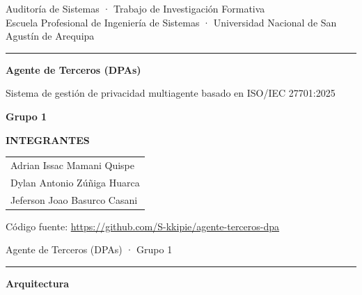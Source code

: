 \documentclass[11pt,a4paper]{article}
\begin{document}
\color{tinta}

{\small\color{suave} Auditoría de Sistemas · Trabajo de Investigación Formativa\\
Escuela Profesional de Ingeniería de Sistemas · Universidad Nacional de San Agustín de Arequipa}

{\color{guinda}\rule{\linewidth}{1.2pt}}

{\raggedright
\vspace*{38mm}
{\fontsize{30}{34}\selectfont\bfseries Agente de Terceros (DPAs)\par}
\vspace{4mm}
{\large\color{suave} Sistema de gestión de privacidad multiagente basado en ISO/IEC 27701:2025\par}

\vspace{16mm}
{\fontsize{24}{28}\selectfont\bfseries\color{guinda} Grupo 1\par}

\vspace{10mm}
{\large\bfseries\color{guinda} INTEGRANTES\par}
\vspace{3mm}
{\Large
\begin{tabular}{@{}l@{}}
Adrian Issac Mamani Quispe\\[3mm]
Dylan Antonio Zúñiga Huarca\\[3mm]
Jeferson Joao Basurco Casani
\end{tabular}\par}

\par}
\vfill
{\small\color{suave} Código fuente: \url{https://github.com/S-kkipie/agente-terceros-dpa}}

\newpage
{\small\color{suave} Agente de Terceros (DPAs) · Grupo 1}

{\color{guinda}\rule{\linewidth}{1.2pt}}

\vspace{2mm}
{\LARGE\bfseries Arquitectura\par}
\vspace{8mm}
\end{document}
